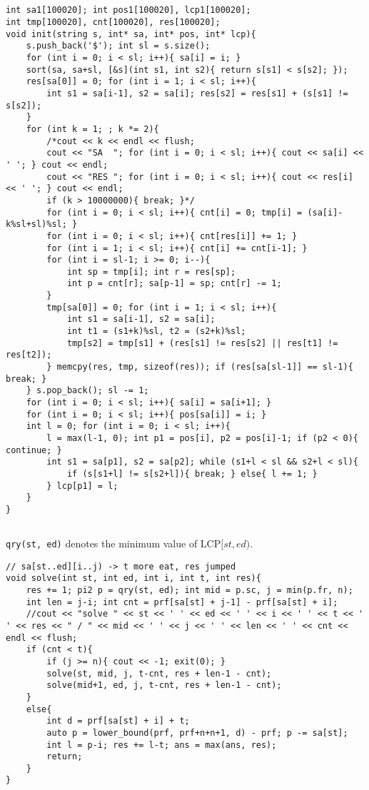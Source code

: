\documentclass[landscape, 8pt, a4paper, oneside, twocolumn]{extarticle}
\begin{document}
\subsection{}
\begin{verbatim}
int sa1[100020]; int pos1[100020], lcp1[100020];
int tmp[100020], cnt[100020], res[100020];
void init(string s, int* sa, int* pos, int* lcp){
    s.push_back('$'); int sl = s.size();
    for (int i = 0; i < sl; i++){ sa[i] = i; }
    sort(sa, sa+sl, [&s](int s1, int s2){ return s[s1] < s[s2]; });
    res[sa[0]] = 0; for (int i = 1; i < sl; i++){
        int s1 = sa[i-1], s2 = sa[i]; res[s2] = res[s1] + (s[s1] != s[s2]);
    }
    for (int k = 1; ; k *= 2){
        /*cout << k << endl << flush;
        cout << "SA  "; for (int i = 0; i < sl; i++){ cout << sa[i] << ' '; } cout << endl;
        cout << "RES "; for (int i = 0; i < sl; i++){ cout << res[i] << ' '; } cout << endl;
        if (k > 10000000){ break; }*/
        for (int i = 0; i < sl; i++){ cnt[i] = 0; tmp[i] = (sa[i]-k%sl+sl)%sl; }
        for (int i = 0; i < sl; i++){ cnt[res[i]] += 1; }
        for (int i = 1; i < sl; i++){ cnt[i] += cnt[i-1]; }
        for (int i = sl-1; i >= 0; i--){
            int sp = tmp[i]; int r = res[sp];
            int p = cnt[r]; sa[p-1] = sp; cnt[r] -= 1;
        }
        tmp[sa[0]] = 0; for (int i = 1; i < sl; i++){
            int s1 = sa[i-1], s2 = sa[i];
            int t1 = (s1+k)%sl, t2 = (s2+k)%sl;
            tmp[s2] = tmp[s1] + (res[s1] != res[s2] || res[t1] != res[t2]);
        } memcpy(res, tmp, sizeof(res)); if (res[sa[sl-1]] == sl-1){ break; }
    } s.pop_back(); sl -= 1;
    for (int i = 0; i < sl; i++){ sa[i] = sa[i+1]; }
    for (int i = 0; i < sl; i++){ pos[sa[i]] = i; }
    int l = 0; for (int i = 0; i < sl; i++){
        l = max(l-1, 0); int p1 = pos[i], p2 = pos[i]-1; if (p2 < 0){ continue; }
        int s1 = sa[p1], s2 = sa[p2]; while (s1+l < sl && s2+l < sl){
            if (s[s1+l] != s[s2+l]){ break; } else{ l += 1; }
        } lcp[p1] = l;
    }
}
\end{verbatim}
\subsection{}
\texttt{qry(st, ed)} denotes the minimum value of $\mathrm{LCP}[st, ed)$.
\begin{verbatim}
// sa[st..ed][i..j) -> t more eat, res jumped
void solve(int st, int ed, int i, int t, int res){
	res += 1; pi2 p = qry(st, ed); int mid = p.sc, j = min(p.fr, n);
	int len = j-i; int cnt = prf[sa[st] + j-1] - prf[sa[st] + i];
	//cout << "solve " << st << ' ' << ed << ' ' << i << ' ' << t << ' ' << res << " / " << mid << ' ' << j << ' ' << len << ' ' << cnt << endl << flush;
	if (cnt < t){
		if (j >= n){ cout << -1; exit(0); }
		solve(st, mid, j, t-cnt, res + len-1 - cnt);
		solve(mid+1, ed, j, t-cnt, res + len-1 - cnt);
	}
	else{
		int d = prf[sa[st] + i] + t;
		auto p = lower_bound(prf, prf+n+n+1, d) - prf; p -= sa[st];
		int l = p-i; res += l-t; ans = max(ans, res);
		return;
	}
}
\end{verbatim}
\end{document}
